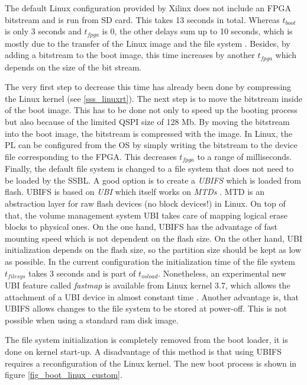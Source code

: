 The default Linux configuration provided by Xilinx does not include an \ac{FPGA} bitstream and is run from \ac{SD} card.
This takes 13 seconds in total.
Whereas $t_{boot}$ is only 3 seconds and $t_{fpga}$ is 0, the other delays sum up to 10 seconds, which is mostly due to the transfer of the Linux image and the file system . 
Besides, by adding a bitstream to the boot image, this time increases by another $ t_{fpga} $ which depends on the size of the bit stream.   
\par
The very first step to decrease this time has already been done by compressing the Linux kernel (see \ref{sss_linuxrt}).
The next step is to move the bitstream inside of the boot image.
This has to be done not only to speed up the booting process but also because of the limited \ac{QSPI} size of 128 Mb.
By moving the bitstream into the boot image, the bitstream is compressed with the image. 
In Linux, the \ac{PL} can be configured from the \ac{OS} by simply writing the bitstream to the device file corresponding to the \ac{FPGA}. 
This decreases $t_{fpga}$ to a range of milliseconds. 
Finally, the default file system is changed to a file system that does not need to be loaded by the \ac{SSBL}.
A good option is to create a \textit{\ac{UBIFS}} \cite{ubifs} which is loaded from flash.
\ac{UBIFS} is based on \textit{\ac{UBI}} which itself works on \textit{\acp{MTD}} \cite{mtd}.
\ac{MTD} is an abstraction layer for raw flash devices (no block devices!) in Linux.
On top of that, the volume management system \ac{UBI} takes care of mapping logical erase blocks to physical ones.  
On the one hand, \ac{UBIFS} has the advantage of fast mounting speed which is not dependent on the flash size.
On the other hand, \ac{UBI} initialization depends on the flash size, so the partition size should be kept as low as possible.
In the current configuration the initialization time of the file system $t_{filesys}$ takes 3 seconds and is part of $t_{osload}$.
Nonetheless, an experimental new \ac{UBI} feature called \textit{fastmap} is available from Linux kernel 3.7, which allows the attachment of a \ac{UBI} device in almost constant time \cite{ubi}.
Another advantage is, that \ac{UBIFS} allows changes to the file system to be stored at power-off.
This is not possible when using a standard ram disk image.
\par
The file system initialization is completely removed from the boot loader, it is done on kernel start-up.
A disadvantage of this method is that using \ac{UBIFS} requires a reconfiguration of the Linux kernel.
The new boot process is shown in figure \ref{fig_boot_linux_custom}. 

